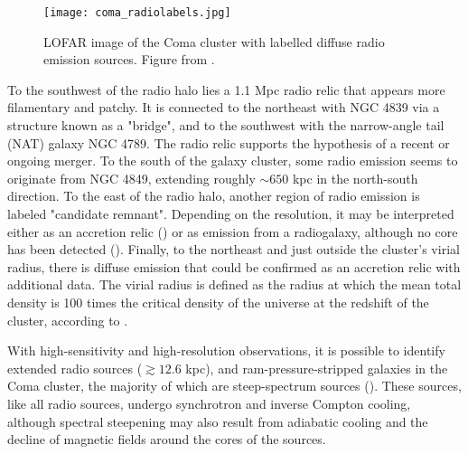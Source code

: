 \documentclass[11pt,letterpaper]{article}
\begin{document}
\begin{figure}[t]
	\centering
	\texttt{[image: coma\_radiolabels.jpg]}
	\caption{LOFAR image of the Coma cluster with labelled diffuse radio emission sources. Figure from \cite{bonafede_coma_2022-1}.}
	\label{fig:coma_radiolabels}
\end{figure}

\medskip
\par To the southwest of the radio halo lies a 1.1 Mpc radio relic that appears more filamentary and patchy. It is connected to the northeast with NGC 4839 via a structure known as a "bridge", and to the southwest with the narrow-angle tail (NAT) galaxy NGC 4789. The radio relic supports the hypothesis of a recent or ongoing merger. To the south of the galaxy cluster, some radio emission seems to originate from NGC 4849, extending roughly $\sim 650$ kpc in the north-south direction. To the east of the radio halo, another region of radio emission is labeled "candidate remnant". Depending on the resolution, it may be interpreted either as an accretion relic (\cite{pizzo_tomography_2010}) or as emission from a radiogalaxy, although no core has been detected (\cite{bonafede_coma_2022-1}). Finally, to the northeast and just outside the cluster's virial radius, there is diffuse emission that could be confirmed as an accretion relic with additional data. The virial radius is defined as the radius at which the mean total density is 100 times the critical density of the universe at the redshift of the cluster, according to \cite{bonafede_coma_2022-1}.

\medskip
\par With high-sensitivity and high-resolution observations, it is possible to identify extended radio sources ($\gtrsim 12.6$ kpc), and ram-pressure-stripped galaxies in the Coma cluster, the majority of which are steep-spectrum sources (\cite{lal_high-resolution_2022}). These sources, like all radio sources, undergo synchrotron and inverse Compton cooling, although spectral steepening may also result from adiabatic cooling and the decline of magnetic fields around the cores of the sources.

\end{document}
